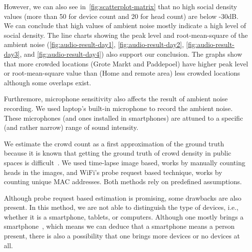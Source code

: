 	However, we can also see in~\autoref{fig:scatterplot-matrix} that no high social density values (more than 50 for device count and 20 for head count) are below -30dB. We can conclude that high values of ambient noise mostly indicate a high level of social density. The line charts showing the peak level and root-mean-square of the ambient noise (\autoref{fig:audio-result-day1}, \autoref{fig:audio-result-day2}, \autoref{fig:audio-result-day3}, and \autoref{fig:audio-result-day4}) also support our conclusion. The graphs show that more crowded locations (Grote Markt and Paddepoel) have higher peak level or root-mean-square value than (Home and remote area) less crowded locations although some overlaps exist.

	Furthremore, microphone sensitivity also affects the result of ambient noise recording. We used laptop's built-in microphone to record the ambient noise. These microphones (and ones installed in smartphones) are attuned to a specific (and rather narrow) range of sound intensity.



	We estimate the crowd count as a first approximation of the ground truth because it is known that getting the ground truth of crowd density in public spaces is difficult~\cite{thesis041}. We used time-lapse image based, works by manually counting heads in the images, and WiFi's probe request based technique, works by counting unique \ac{MAC} addresses. Both methods rely on predefined assumptions.

	Although probe request based estimation is promising, some drawbacks are also present. In this method, we are not able to distinguish the type of devices, i.e., whether it is a smartphone, tablets, or computers. Although one mostly brings a smartphone~\cite{thesis047}, which means we can deduce that a smartphone means a person present, there is also a possibility that one brings more devices or no devices at all.

